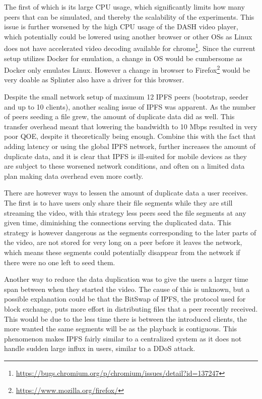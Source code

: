 The first of which is its large \ac{CPU} usage, which significantly limits how many peers that can be simulated, and thereby the scalability of the experiments.
This issue is further worsened by the high \ac{CPU} usage of the \ac{DASH} video player, which potentially could be lowered using another browser or other \acp{OS} as Linux does not have accelerated video decoding available for chrome\footnote{\url{https://bugs.chromium.org/p/chromium/issues/detail?id=137247}}. Since the current setup utilizes Docker for emulation, a change in \ac{OS} would be cumbersome as Docker only emulates Linux. However a change in browser to Firefox\footnote{\url{https://www.mozilla.org/firefox/}} would be very doable as Splinter also have a driver for this browser.

Despite the small network setup of maximum 12 \ac{IPFS} peers (bootstrap, seeder and up to 10 clients), another scaling issue of \ac{IPFS} was apparent. As the number of peers seeding a file grew, the amount of duplicate data did as well. This transfer overhead meant that lowering the bandwidth to 10 \ac{Mbps} resulted in very poor \ac{QOE}, despite it theoretically being enough. Combine this with the fact that adding latency or using the global \ac{IPFS} network, further increases the amount of duplicate data, and it is clear that \ac{IPFS} is ill-suited for mobile devices as they are subject to these worsened network conditions, and often on a limited data plan making data overhead even more costly. 

There are however ways to lessen the amount of duplicate data a user receives.
The first is to have users only share their file segments while they are still streaming the video, with this strategy less peers seed the file segments at any given time, diminishing the connections serving the duplicated data. This strategy is however dangerous as the segments corresponding to the later parts of the video, are not stored for very long on a peer before it leaves the network, which means these segments could potentially disappear from the network if there were no one left to seed them. 

Another way to reduce the data duplication was to give the users a larger time span between when they started the video. The cause of this is unknown, but a possible explanation could be that the BitSwap of \ac{IPFS}, the protocol used for block exchange, puts more effort in distributing files that a peer recently received. This would be due to the less time there is between the introduced clients, the more wanted the same segments will be as the playback is contiguous.
This phenomenon makes \ac{IPFS} fairly similar to a centralized system as it does not handle sudden large influx in users, similar to a \acl{DDoS} attack.

